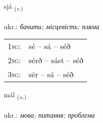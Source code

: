 \documentclass[frontgrid, backgrid]{flacards}\usepackage[]{graphicx}\usepackage[]{xcolor}
\begin{document}
\renewcommand{\blhead}{\vskip5pt {\small\bfseries\footnotesize Sagnorð | дієслово }}
\renewcommand{\bcfoot}{\vskip5pt \hspace{2pt}{\small\bfseries\footnotesize 1K}}


{sjá \small{\textsubscript{(\textit{v.})}} \\[1ex] %
\textphonetic{[sjauː]} \\
ukr.: \emph{бачити; місцевість; пляма} \\  [2ex]
\renewcommand*{\arraystretch}{0.8}
\begin{tabular}{p{1cm}l}
\textsc{1sg}: & sé -- sá -- séð \\ 
\textsc{2sg}: & sérð -- sást -- séð \\ 
\textsc{3sg}: & sér -- sá -- séð \\ 
\end{tabular}
}

\renewcommand{\flhead}{\vskip5pt \fboxsep=0pt {\small\bfseries\footnotesize Nafnorð | іменник}}
\renewcommand{\fcfoot}{\vskip5pt \fboxsep=0pt \hspace{2pt}{\small\bfseries\footnotesize 1K}}

\renewcommand{\blhead}{\vskip5pt {\small\bfseries\footnotesize Nafnorð | іменник }}
\renewcommand{\bcfoot}{\vskip5pt \hspace{2pt}{\small\bfseries\footnotesize 1K}}


{mál \small{\textsubscript{(\textit{n.})}} \\[1ex] %
\textphonetic{[mauːl]} \\
ukr.: \emph{мова; питання; проблема} \\  [2ex]
\renewcommand*{\arraystretch}{0.8}
}

\renewcommand{\flhead}{\vskip5pt \fboxsep=0pt {\small\bfseries\footnotesize Atviksorð | прислівник}}
\renewcommand{\fcfoot}{\vskip5pt \fboxsep=0pt \hspace{2pt}{\small\bfseries\footnotesize 1K}}
\end{document}
